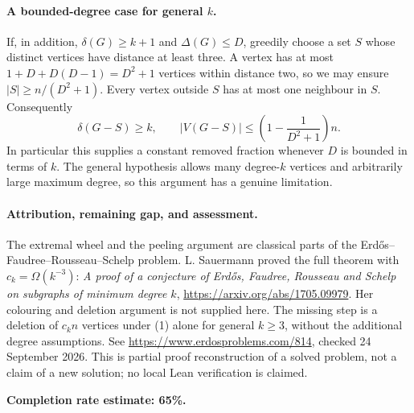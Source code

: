 \paragraph{A bounded-degree case for general \(k\).}
If, in addition, \(\delta(G)\geq k+1\) and \(\Delta(G)\leq D\), greedily choose a set \(S\) whose distinct vertices have distance at least three. A vertex has at most \(1+D+D(D-1)=D^2+1\) vertices within distance two, so we may ensure
\(|S|\geq n/(D^2+1)\). Every vertex outside \(S\) has at most one neighbour in \(S\). Consequently
\[
 \delta(G-S)\geq k,
 \qquad |V(G-S)|\leq\left(1-\frac1{D^2+1}\right)n.
\]
In particular this supplies a constant removed fraction whenever \(D\) is bounded in terms of \(k\). The general hypothesis allows many degree-\(k\) vertices and arbitrarily large maximum degree, so this argument has a genuine limitation.

\paragraph{Attribution, remaining gap, and assessment.}
The extremal wheel and the peeling argument are classical parts of the Erd\H{o}s--Faudree--Rousseau--Schelp problem. L. Sauermann proved the full theorem with \(c_k=\Omega(k^{-3})\): \emph{A proof of a conjecture of Erd\H{o}s, Faudree, Rousseau and Schelp on subgraphs of minimum degree \(k\)}, \url{https://arxiv.org/abs/1705.09979}. Her colouring and deletion argument is not supplied here. The missing step is a deletion of \(c_kn\) vertices under (1) alone for general \(k\geq3\), without the additional degree assumptions. See \url{https://www.erdosproblems.com/814}, checked 24 September 2026. This is partial proof reconstruction of a solved problem, not a claim of a new solution; no local Lean verification is claimed.

\textbf{Completion rate estimate: 65\%.}
